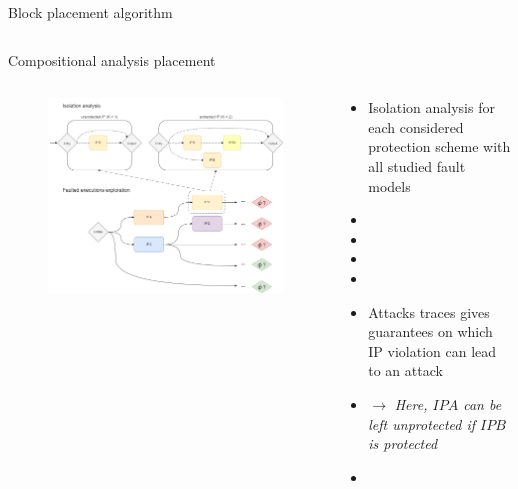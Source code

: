 \begin{frame}[fragile]{Block placement algorithm}
\begin{columns}
\begin{column}{0.5\textwidth}
\begin{tiny}
                \vfill
        	\end{tiny}
        \end{column}
    \end{columns}
\end{frame}

\begin{frame}[fragile]{Compositional analysis placement}
    \begin{columns}
        \begin{column}{0.6\textwidth}
            \begin{figure}
                \includegraphics[scale=0.21]{img/placement-isolation-end.drawio.png}
            \end{figure}
        \end{column}
        \begin{column}{0.4\textwidth}
            \begin{tiny}
                \begin{itemize}
                    \item Isolation analysis for each considered protection scheme with all studied fault models                
                    \item []
                    \item []
                    \item []
                    \item []                
                    \item Attacks traces gives guarantees on which IP violation can lead to an attack
                    \item [] $\rightarrow$ \textit{Here, $IP A$ can be left unprotected if $IP B$ is protected}
                    \item []
                \end{itemize}
    

\end{tiny}
\end{column}
\end{columns}
\end{frame}
